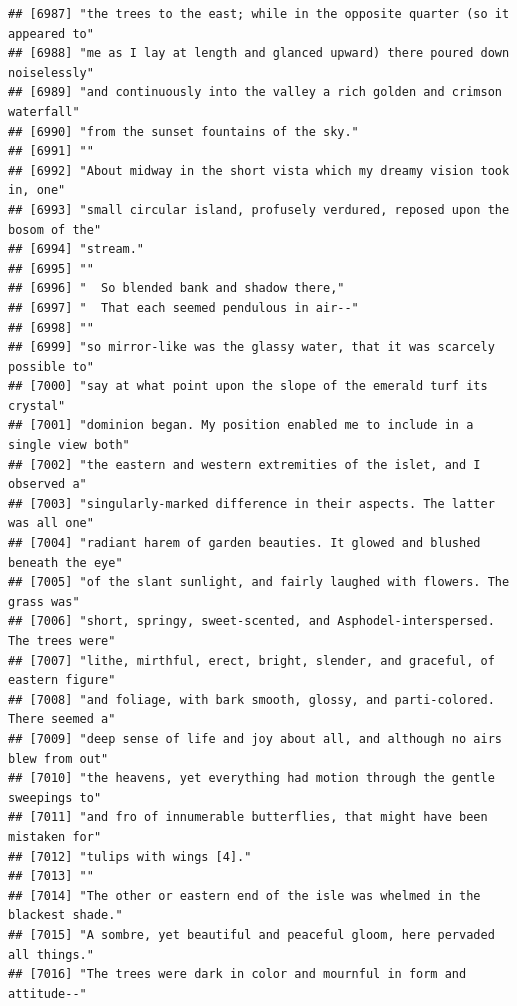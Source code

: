 \documentclass{article}\usepackage[]{graphicx}\usepackage[]{color}
\makeatletter
\newenvironment{kframe}{%
 \def\at@end@of@kframe{}%
 \ifinner\ifhmode%
  \def\at@end@of@kframe{\end{minipage}}%
  \begin{minipage}{\columnwidth}%
 \fi\fi%
 \def\FrameCommand##1{\hskip\@totalleftmargin \hskip-\fboxsep
 \colorbox{shadecolor}{##1}\hskip-\fboxsep
     \hskip-\linewidth \hskip-\@totalleftmargin \hskip\columnwidth}%
 \MakeFramed {\advance\hsize-\width
   \@totalleftmargin\z@ \linewidth\hsize
   \@setminipage}}%
 {\par\unskip\endMakeFramed%
 \at@end@of@kframe}
\newenvironment{knitrout}{}{} %
\makeatother
\begin{document}
\begin{knitrout}
\begin{kframe}
\begin{verbatim}
## [6987] "the trees to the east; while in the opposite quarter (so it appeared to"     
## [6988] "me as I lay at length and glanced upward) there poured down noiselessly"     
## [6989] "and continuously into the valley a rich golden and crimson waterfall"        
## [6990] "from the sunset fountains of the sky."                                       
## [6991] ""                                                                            
## [6992] "About midway in the short vista which my dreamy vision took in, one"         
## [6993] "small circular island, profusely verdured, reposed upon the bosom of the"    
## [6994] "stream."                                                                     
## [6995] ""                                                                            
## [6996] "  So blended bank and shadow there,"                                         
## [6997] "  That each seemed pendulous in air--"                                       
## [6998] ""                                                                            
## [6999] "so mirror-like was the glassy water, that it was scarcely possible to"       
## [7000] "say at what point upon the slope of the emerald turf its crystal"            
## [7001] "dominion began. My position enabled me to include in a single view both"     
## [7002] "the eastern and western extremities of the islet, and I observed a"          
## [7003] "singularly-marked difference in their aspects. The latter was all one"       
## [7004] "radiant harem of garden beauties. It glowed and blushed beneath the eye"     
## [7005] "of the slant sunlight, and fairly laughed with flowers. The grass was"       
## [7006] "short, springy, sweet-scented, and Asphodel-interspersed. The trees were"    
## [7007] "lithe, mirthful, erect, bright, slender, and graceful, of eastern figure"    
## [7008] "and foliage, with bark smooth, glossy, and parti-colored. There seemed a"    
## [7009] "deep sense of life and joy about all, and although no airs blew from out"    
## [7010] "the heavens, yet everything had motion through the gentle sweepings to"      
## [7011] "and fro of innumerable butterflies, that might have been mistaken for"       
## [7012] "tulips with wings [4]."                                                      
## [7013] ""                                                                            
## [7014] "The other or eastern end of the isle was whelmed in the blackest shade."     
## [7015] "A sombre, yet beautiful and peaceful gloom, here pervaded all things."       
## [7016] "The trees were dark in color and mournful in form and attitude--"            

\end{verbatim}
\end{kframe}
\end{knitrout}
\end{document}
